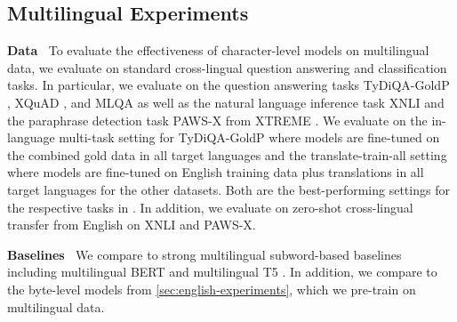 \documentclass{article} \usepackage{iclr2022_conference,times}
\begin{document}
\subsection{Multilingual Experiments} \label{sec:multilingual}



\noindent \textbf{Data} $\:$ To evaluate the effectiveness of character-level models on multilingual data, we evaluate on standard cross-lingual question answering and classification tasks. In particular, we evaluate on the question answering tasks TyDiQA-GoldP \citep{Clark2020tydiqa}, XQuAD \citep{Artetxe2020crosslingual}, and MLQA \citep{Lewis2020mlqa} as well as the natural language inference task XNLI \citep{Conneau2018xnli} and the paraphrase detection task PAWS-X \citep{Yang2019paws-x} from XTREME \citep{Hu2020xtreme}. We evaluate on the in-language multi-task setting for TyDiQA-GoldP \citep{Clark2020tydiqa} where models are fine-tuned on the combined gold data in all target languages and the translate-train-all setting where models are fine-tuned on English training data plus translations in all target languages for the other datasets. Both are the best-performing settings for the respective tasks in \citep{Hu2020xtreme}. In addition, we evaluate on zero-shot cross-lingual transfer from English on XNLI and PAWS-X.

\noindent \textbf{Baselines} $\:$ We compare to strong multilingual subword-based baselines including multilingual BERT \citep{Devlin2019bert} and multilingual T5 \citep{xue2020mt5}. In addition, we compare to the byte-level models from \textsection \ref{sec:english-experiments}, which we pre-train on multilingual data.
\end{document}
